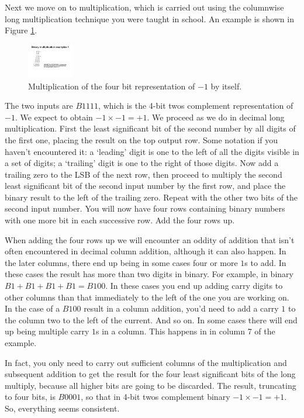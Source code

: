 \documentclass[../physical_computing.tex]{subfiles}
\begin{document}
Next we move on to multiplication, which is carried out using the columnwise long multiplication technique you were taught in school. An example is shown in Figure \ref{fig:multiplication_example_1}.
\begin{figure}[h!]
    \centering
    \includegraphics[width=0.18\textwidth]{figures/multiplication_example_1.pdf}
    \caption{Multiplication of the four bit representation of $-1$ by itself.}
    \label{fig:multiplication_example_1}
\end{figure}
The two inputs are $B1111$, which is the 4-bit twos complement representation of $-1$. We expect to obtain $-1\times-1=+1$. We proceed as we do in decimal long multiplication. First the least significant bit of the second number by all digits of the first one, placing the result on the top output row. Some notation if you haven't encountered it: a `leading' digit is one to the left of all the digits visible in a set of digits; a `trailing' digit is one to the right of those digits. Now add a trailing zero to the LSB of the next row, then proceed to multiply the second least significant bit of the second input number by the first row, and place the binary result to the left of the trailing zero. Repeat with the other two bits of the second input number. You will now have four rows containing binary numbers with one more bit in each successive row. Add the four rows up. 

When adding the four rows up we will encounter an oddity of addition that isn't often encountered in decimal column addition, although it can also happen. In the later columns, there end up being in some cases four or more $1$s to add. In these cases the result has more than two digits in binary. For example, in binary $B1+B1+B1+B1=B100$. In these cases you end up adding carry digits to other columns than that immediately to the left of the one you are working on. In the case of a $B100$ result in a column addition, you'd need to add a carry $1$ to the column two to the left of the current. And so on. In some cases there will end up being multiple carry $1$s in a column. This happens in in column 7 of the example. 

In fact, you only need to carry out sufficient columns of the multiplication and subsequent addition to get the result for the four least significant bits of the long multiply, because all higher bits are going to be discarded. The result, truncating to four bits, is $B0001$, so that in 4-bit twos complement binary $-1\times-1=+1$. So, everything seems consistent.
\end{document}
